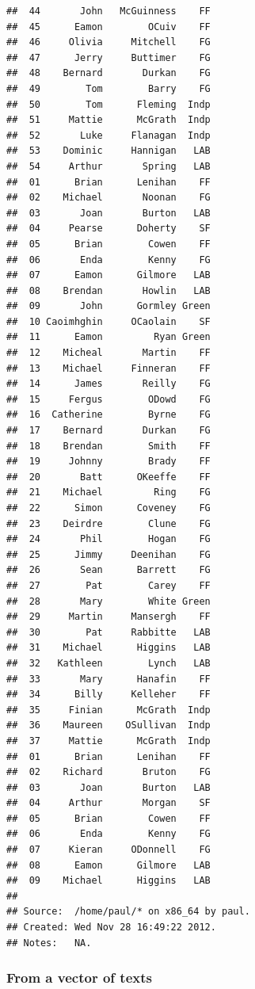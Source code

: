 \documentclass[11pt]{article}\usepackage[]{graphicx}\usepackage[]{color}
\makeatletter
\newenvironment{kframe}{%
 \def\at@end@of@kframe{}%
 \ifinner\ifhmode%
  \def\at@end@of@kframe{\end{minipage}}%
  \begin{minipage}{\columnwidth}%
 \fi\fi%
 \def\FrameCommand##1{\hskip\@totalleftmargin \hskip-\fboxsep
 \colorbox{shadecolor}{##1}\hskip-\fboxsep
     \hskip-\linewidth \hskip-\@totalleftmargin \hskip\columnwidth}%
 \MakeFramed {\advance\hsize-\width
   \@totalleftmargin\z@ \linewidth\hsize
   \@setminipage}}%
 {\par\unskip\endMakeFramed%
 \at@end@of@kframe}
\newenvironment{knitrout}{}{} %
\makeatother
\begin{document}
\begin{knitrout}
\begin{kframe}
\begin{verbatim}
##  44       John   McGuinness    FF
##  45      Eamon        OCuiv    FF
##  46     Olivia     Mitchell    FG
##  47      Jerry     Buttimer    FG
##  48    Bernard       Durkan    FG
##  49        Tom        Barry    FG
##  50        Tom      Fleming  Indp
##  51     Mattie      McGrath  Indp
##  52       Luke     Flanagan  Indp
##  53    Dominic     Hannigan   LAB
##  54     Arthur       Spring   LAB
##  01      Brian      Lenihan    FF
##  02    Michael       Noonan    FG
##  03       Joan       Burton   LAB
##  04     Pearse      Doherty    SF
##  05      Brian        Cowen    FF
##  06       Enda        Kenny    FG
##  07      Eamon      Gilmore   LAB
##  08    Brendan       Howlin   LAB
##  09       John      Gormley Green
##  10 Caoimhghin     OCaolain    SF
##  11      Eamon         Ryan Green
##  12    Micheal       Martin    FF
##  13    Michael     Finneran    FF
##  14      James       Reilly    FG
##  15     Fergus        ODowd    FG
##  16  Catherine        Byrne    FG
##  17    Bernard       Durkan    FG
##  18    Brendan        Smith    FF
##  19     Johnny        Brady    FF
##  20       Batt      OKeeffe    FF
##  21    Michael         Ring    FG
##  22      Simon      Coveney    FG
##  23    Deirdre        Clune    FG
##  24       Phil        Hogan    FG
##  25      Jimmy     Deenihan    FG
##  26       Sean      Barrett    FG
##  27        Pat        Carey    FF
##  28       Mary        White Green
##  29     Martin     Mansergh    FF
##  30        Pat     Rabbitte   LAB
##  31    Michael      Higgins   LAB
##  32   Kathleen        Lynch   LAB
##  33       Mary      Hanafin    FF
##  34      Billy     Kelleher    FF
##  35     Finian      McGrath  Indp
##  36    Maureen    OSullivan  Indp
##  37     Mattie      McGrath  Indp
##  01      Brian      Lenihan    FF
##  02    Richard       Bruton    FG
##  03       Joan       Burton   LAB
##  04     Arthur       Morgan    SF
##  05      Brian        Cowen    FF
##  06       Enda        Kenny    FG
##  07     Kieran     ODonnell    FG
##  08      Eamon      Gilmore   LAB
##  09    Michael      Higgins   LAB
## 
## Source:  /home/paul/* on x86_64 by paul.
## Created: Wed Nov 28 16:49:22 2012.
## Notes:   NA.
\end{verbatim}
\end{kframe}
\end{knitrout}


\subsubsection{From a vector of texts}
\end{document}
